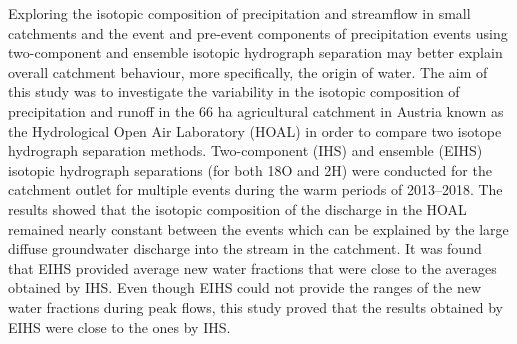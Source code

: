 Exploring the isotopic composition of precipitation and streamflow in small catchments and the event and pre-event components of precipitation events using two-component and ensemble isotopic hydrograph separation may better explain overall catchment behaviour, more specifically, the origin of water. The aim of this study was to investigate the variability in the isotopic composition of precipitation and runoff in the 66 ha agricultural catchment in Austria known as the Hydrological Open Air Laboratory (HOAL) in order to compare two isotope hydrograph separation methods. Two-component (IHS) and ensemble (EIHS) isotopic hydrograph separations (for both 18O and 2H) were conducted for the catchment outlet for multiple events during the warm periods of 2013–2018. The results showed that the isotopic composition of the discharge in the HOAL remained nearly constant between the events which can be explained by the large diffuse groundwater discharge into the stream in the catchment. It was found that EIHS provided average new water fractions that were close to the averages obtained by IHS. Even though EIHS could not provide the ranges of the new water fractions during peak flows, this study proved that the results obtained by EIHS were close to the ones by IHS.
\newpage{}
{}
\begin{flushleft}





\end{flushleft}

\noindent

